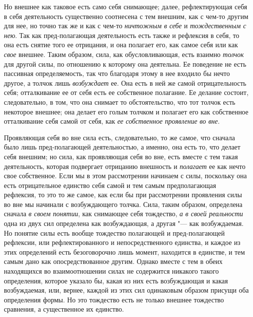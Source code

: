 Но внешнее как таковое есть само себя снимающее; далее, рефлектирующая себя
в себя деятельность существенно соотнесена с тем внешним, как с чем-то
другим для нее, но точно так же и как с чем-то {\em ничтожным в себе} и
{\em тождественным с нею}. Так как пред-полагающая
деятельность есть также и рефлексия в себя, то она есть снятие того ее
отрицания, и она полагает его, как самое себя или как
{\em свое} внешнее. Таким образом, сила, как
обусловливающая, есть взаимно {\em толчок} для другой
силы, по отношению к которому она деятельна. Ее поведение не есть пассивная
определяемость, так что благодаря этому в нее входило бы нечто другое, а
толчок лишь {\em возбуждает} ее. Она есть в ней же
самой отрицательность себя; отталкивание ее от себя есть ее собственное
полагание. Ее делание состоит, следовательно, в том, что она снимает то
обстоятельство, что тот толчок есть некоторое внешнее; она делает его голым
толчком и полагает его как собственное отталкивание себя самой от себя, как
{\em ее собственное проявление во вне}.

Проявляющая себя во вне сила есть, следовательно, то же самое, что сначала
было лишь пред-полагающей деятельностью, а именно, она есть то, что делает
себя внешним; но сила, как проявляющая себя во вне, есть вместе с тем такая
деятельность, которая подвергает отрицанию внешность и
{\em полагает} ее как нечто свое собственное. Если мы в
этом рассмотрении начинаем с силы, поскольку она есть отрицательное
единство себя самой и тем самым предполагающая рефлексия, то это то же
самое, как если бы при рассмотрении проявления силы во вне мы начинали с
возбуждающего толчка. Сила, таким образом, определена сначала
{\em в своем понятии}, как снимающее себя тождество,
{\em а в своей реальности} одна из двух сил определена
как возбуждающая, а другая "--- как возбуждаемая. Но понятие силы есть вообще
тождество полагающей и пред-полагающей рефлексии, или рефлектированного и
непосредственного единства, и каждое из этих определений есть безоговорочно
лишь момент, находится в единстве, и тем самым дано как опосредствованное
другим. Однако вместе с тем в обеих находящихся во взаимоотношении силах не
содержится никакого такого определения, которое указало бы, какая из них
есть возбуждающая и какая возбуждаемая, или, вернее, каждой из этих сил
одинаковым образом присущи оба определения формы. Но это тождество есть не
только внешнее тождество сравнения, а существенное их единство.

